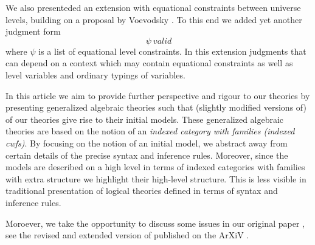 \documentclass[11pt,a4paper]{article}
\theoremstyle{definition}
\begin{document}
We also presenteded an extension with equational constraints between universe levels, building on a proposal by Voevodsky \cite{VV}. To this end we added yet another judgment form
$$
\psi\ valid
$$
where $\psi$ is a list of equational level constraints. In this extension judgments that can depend on a context which may contain equational constraints as well as level variables and ordinary typings of variables.

In this article we aim to provide further perspective and rigour to our theories by presenting generalized algebraic theories such that (slightly modified versions of) of our theories give rise to their initial models. These generalized algebraic theories are based on the notion of an {\em indexed category with families (indexed cwfs)}.
By focusing on the notion of an initial model, we abstract away from certain details of the precise syntax and inference rules.  Moreover, since the models are described on a high level in terms of indexed categories with families with extra structure we highlight their high-level structure. This is less visible in traditional presentation of logical theories defined in terms of syntax and inference rules. 
 
Moroever, we take the opportunity to discuss some issues in our original paper \cite{BezemCDE22}, see the revised and extended version of published on the ArXiV \cite{BezemCDE22:revised}.
\end{document}
